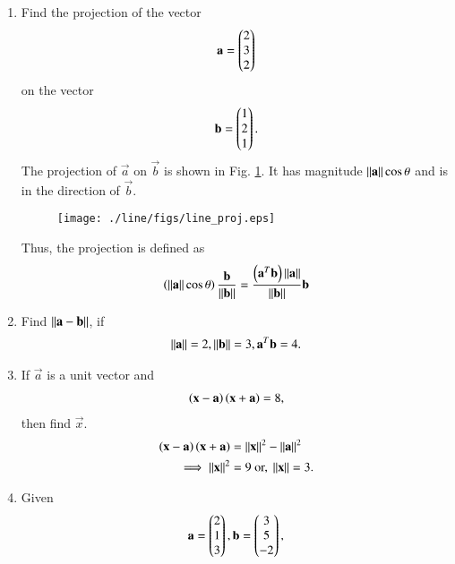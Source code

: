 \begin{enumerate}[label=\arabic*.,ref=\thesubsection.\theenumi]
\item Find the projection of the vector 
\begin{align}
\mathbf{a} = \begin{pmatrix}2\\3\\2\end{pmatrix}
\end{align}
on the vector
\begin{align}
\mathbf{b}=\begin{pmatrix}1\\2\\1\end{pmatrix}.
\end{align}
%
\solution The projection of $\vec{a}$ on $\vec{b}$ is shown in Fig. \ref{fig:line_proj}. It has magnitude $\left\lVert\mathbf{a}\right\rVert\cos \theta$ and is in the direction of $\vec{b}$.
%
%
\begin{figure}
\centering
\texttt{[image: ./line/figs/line\_proj.eps]}
\caption{}
\label{fig:line_proj}
\end{figure}
%
Thus, the projection is defined as 
\begin{align}
\left(\left\lVert\mathbf{a}\right\rVert\cos\theta\right) \frac{\mathbf{b}}{\left\lVert\mathbf{b}\right\rVert}
=  \frac{\left(\mathbf{a}^T\mathbf{b}\right)\left\lVert\mathbf{a}\right\rVert}{\left\lVert\mathbf{b}\right\rVert}\mathbf{b}
\end{align}
\item Find $\left\lVert\mathbf{a}-\mathbf{b}\right\rVert$, if 
\begin{align}
\left\lVert\mathbf{a}\right\rVert = 2, 
\left\lVert\mathbf{b}\right\rVert = 3,
\mathbf{a}^T\mathbf{b} = 4.
\end{align}
%
\solution 

%
%
\item If $\vec{a}$ is a unit vector and 
%
\begin{align}
\left(\mathbf{x}-\mathbf{a}\right)\left(\mathbf{x}+\mathbf{a}\right) = 8, 
\end{align}
%
then find $\vec{x}$.
%
\\
\solution 
%
\begin{align}
\left(\mathbf{x}-\mathbf{a}\right)\left(\mathbf{x}+\mathbf{a}\right) &= \left\lVert\mathbf{x}\right\rVert^2-\left\lVert\mathbf{a}\right\rVert^2
\\
\implies \left\lVert\mathbf{x}\right\rVert^2 &= 9 \text{ or, } \left\lVert\mathbf{x}\right\rVert = 3.
\end{align}
%
\item Given
\begin{align}
\vec{a}=\myvec{2\\1\\3},
\vec{b}=\myvec{3\\5\\-2},

\end{align}
\end{enumerate}
